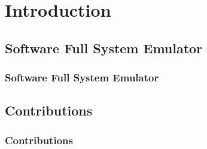 \section{Introduction}

\subsection{Software Full System Emulator}
\begin{frame}
    \frametitle{Software Full System Emulator}
\end{frame}

\subsection{Contributions}
\begin{frame}
    \frametitle{Contributions}
\end{frame}
